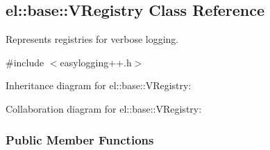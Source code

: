 \hypertarget{a00094}{}\subsection{el\+:\+:base\+:\+:V\+Registry Class Reference}
\label{a00094}


Represents registries for verbose logging.  




{\ttfamily \#include $<$easylogging++.\+h$>$}



Inheritance diagram for el\+:\+:base\+:\+:V\+Registry\+:


Collaboration diagram for el\+:\+:base\+:\+:V\+Registry\+:
\subsubsection*{Public Member Functions}
